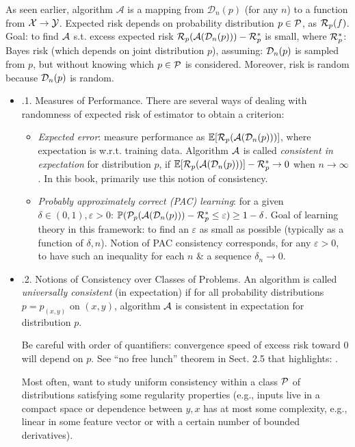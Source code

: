 \documentclass{article}
\begin{document}
\begin{enumerate}
\begin{itemize}
\begin{itemize}
			As seen earlier, algorithm $\mathcal{A}$ is a mapping from $\mathcal{D}_n(p)$ (for any $n$) to a function from ${\cal X}\to{\cal Y}$. Expected risk depends on probability distribution $p\in{\cal P}$, as ${\cal R}_p(f)$. Goal: to find ${\cal A}$ s.t. excess expected risk ${\cal R}_p({\cal A}({\cal D}_n(p))) - {\cal R}_p^*$ is small, where ${\cal R}_p^*$: Bayes risk (which depends on joint distribution $p$), assuming: ${\cal D}_n(p)$ is sampled from $p$, but without knowing which $p\in{\cal P}$ is considered. Moreover, risk is random because ${\cal D}_n(p)$ is random.
			\begin{itemize}
				\item {.1. Measures of Performance.} There are several ways of dealing with randomness of expected risk of estimator to obtain a criterion:
				\begin{itemize}
					\item {\it Expected error}: measure performance as $\mathbb{E}[{\cal R}_p({\cal A}({\cal D}_n(p)))]$, where expectation is w.r.t. training data. Algorithm ${\cal A}$ is called {\it consistent in expectation} for distribution $p$, if $\mathbb{E}[{\cal R}_p({\cal A}({\cal D}_n(p)))] - {\cal R}_p^*\to0$ when $n\to\infty$. In this book, primarily use this notion of consistency.
					\item {\it Probably approximately correct (PAC) learning}: for a given $\delta\in(0,1),\varepsilon > 0$: $\mathbb{P}({\cal P}_p({\cal A}({\cal D}_n(p))) - {\cal R}_p^*\le\varepsilon)\ge1 - \delta$. Goal of learning theory in this framework: to find an $\varepsilon$ as small as possible (typically as a function of $\delta,n$). Notion of PAC consistency corresponds, for any $\varepsilon > 0$, to have such an inequality for each $n$ \& a sequence $\delta_n\to0$.
				\end{itemize}
				\item {.2. Notions of Consistency over Classes of Problems.} An algorithm is called {\it universally consistent} (in expectation) if for all probability distributions $p = p_{(x,y)}$ on $(x,y)$, algorithm ${\cal A}$ is consistent in expectation for distribution $p$.
				
				Be careful with order of quantifiers: convergence speed of excess risk toward 0 will depend on $p$. See ``no free lunch'' theorem in Sect. 2.5 that highlights: .
				
				Most often, want to study uniform consistency within a class ${\cal P}$ of distributions satisfying some regularity properties (e.g., inputs live in a compact space or dependence between $y,x$ has at most some complexity, e.g., linear in some feature vector or with a certain number of bounded derivatives).
				

\end{itemize}
\end{itemize}
\end{itemize}
\end{enumerate}
\end{document}
